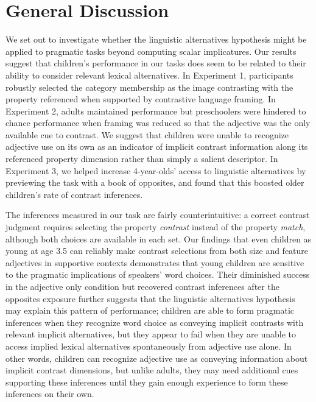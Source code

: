 \documentclass[10pt,letterpaper]{article}
\begin{document}

 \section{General Discussion} 

We set out to investigate whether the linguistic alternatives hypothesis might be applied to pragmatic tasks beyond computing scalar implicatures.  Our results suggest that children's performance in our tasks does seem to be related to their ability to consider relevant lexical alternatives.  In Experiment 1, participants robustly selected the category membership as the image contrasting with the property referenced when supported by contrastive language framing.  In Experiment 2, adults maintained performance but preschoolers were hindered to chance performance when framing was reduced so that the adjective was the only available cue to contrast.  We suggest that children were unable to recognize adjective use on its own as an indicator of implicit contrast information along its referenced property dimension rather than simply a salient descriptor.  In Experiment 3, we helped increase 4-year-olds' access to linguistic alternatives by previewing the task with a book of opposites, and found that this boosted older children's rate of contrast inferences.  

The inferences measured in our task are fairly counterintuitive: a correct contrast judgment requires selecting the property \emph{contrast} instead of the property \emph{match}, although both choices are available in each set.  Our findings that even children as young at age 3.5 can reliably make contrast selections from both size and feature adjectives in supportive contexts demonstrates that young children are sensitive to the pragmatic implications of speakers' word choices.  Their diminished success in the adjective only condition but recovered contrast inferences after the opposites exposure further suggests that the linguistic alternatives hypothesis may explain this pattern of performance; children are able to form pragmatic inferences when they recognize word choice as conveying implicit contrasts with relevant implicit alternatives, but they appear to fail when they are unable to access implied lexical alternatives spontaneously from adjective use alone.  In other words, children can recognize adjective use as conveying information about implicit contrast dimensions, but unlike adults, they may need additional cues supporting these inferences until they gain enough experience to form these inferences on their own. 
\end{document}
